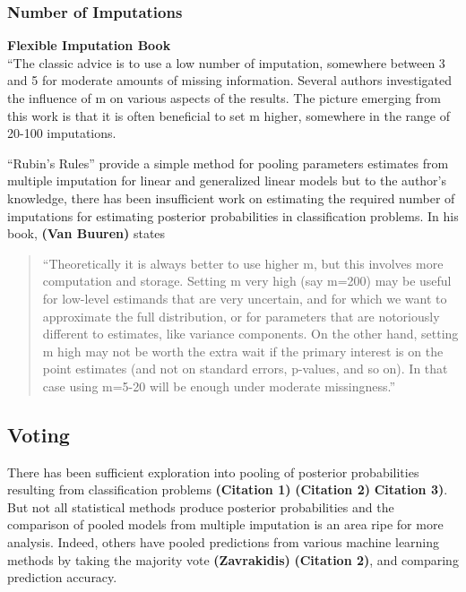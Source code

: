 \documentclass[12pt,]{article}
\begin{document}
\subsubsection{Number of Imputations}\label{number-of-imputations}

\textbf{Flexible Imputation Book}\\
``The classic advice is to use a low number of imputation, somewhere
between 3 and 5 for moderate amounts of missing information. Several
authors investigated the influence of m on various aspects of the
results. The picture emerging from this work is that it is often
beneficial to set m higher, somewhere in the range of 20-100
imputations.

``Rubin's Rules'' provide a simple method for pooling parameters
estimates from multiple imputation for linear and generalized linear
models but to the author's knowledge, there has been insufficient work
on estimating the required number of imputations for estimating
posterior probabilities in classification problems. In his book,
\textbf{(Van Buuren)} states

\begin{quote}
``Theoretically it is always better to use higher m, but this involves
more computation and storage. Setting m very high (say m=200) may be
useful for low-level estimands that are very uncertain, and for which we
want to approximate the full distribution, or for parameters that are
notoriously different to estimates, like variance components. On the
other hand, setting m high may not be worth the extra wait if the
primary interest is on the point estimates (and not on standard errors,
p-values, and so on). In that case using m=5-20 will be enough under
moderate missingness.''
\end{quote}

\subsection{Voting}\label{voting}

There has been sufficient exploration into pooling of posterior
probabilities resulting from classification problems \textbf{(Citation
1)} \textbf{(Citation 2)} \textbf{Citation 3)}. But not all statistical
methods produce posterior probabilities and the comparison of pooled
models from multiple imputation is an area ripe for more analysis.
Indeed, others have pooled predictions from various machine learning
methods by taking the majority vote \textbf{(Zavrakidis)}
\textbf{(Citation 2)}, and comparing prediction accuracy.
\end{document}
